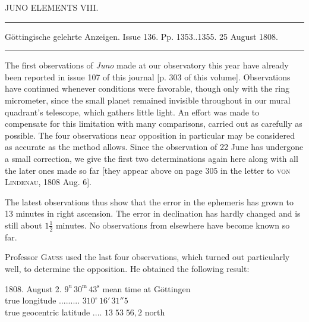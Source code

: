 \begin{center}
JUNO ELEMENTS VIII.
\end{center}

\hrule
\begin{center}
\fontsize{10}{12}\selectfont Göttingische gelehrte Anzeigen. Issue 136. Pp. 1353..1355. 25 August 1808.
\end{center}
\par\vspace{4pt}\hrule\vspace{4pt}

\par\indent The first observations of \emph{Juno} made at our observatory this year have already been reported in issue 107 of this journal [p. 303 of this volume]. Observations have continued whenever conditions were favorable, though only with the ring micrometer, since the small planet remained invisible throughout in our mural quadrant’s telescope, which gathers little light. An effort was made to compensate for this limitation with many comparisons, carried out as carefully as possible. The four observations near opposition in particular may be considered as accurate as the method allows. Since the observation of 22 June has undergone a small correction, we give the first two determinations again here along with all the later ones made so far [they appear above on page 305 in the letter to \textsc{von Lindenau}, 1808 Aug. 6].

\par\indent The latest observations thus show that the error in the ephemeris has grown to 13 minutes in right ascension. The error in declination has hardly changed and is still about $1\frac{1}{2}$ minutes. No observations from elsewhere have become known so far.

\par\indent Professor \textsc{Gauss} used the last four observations, which turned out particularly well, to determine the opposition. He obtained the following result:

\begin{center}
1808. August 2. $9^{\text{u}}\,30^{\text{m}}\,43^{\text{s}}$ mean time at Göttingen\\
true longitude .\;.\;.\;.\;.\;.\;.\;.\;.\; $310^\circ\,16'\,31''5$\\
true geocentric latitude .\;.\;.\;.\; $13\;53\;56,2$ north
\end{center}

